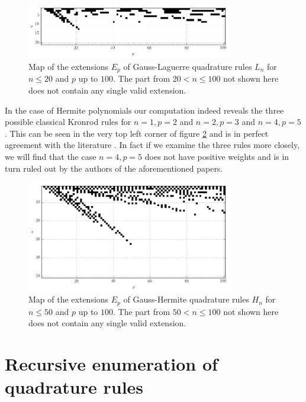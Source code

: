 \documentclass[a4paper,10pt]{article}
\begin{document}
\begin{figure}
  \centering
  \includegraphics[width=0.8\textwidth]{./img/map_lag_20_100.png}
  \caption{Map of the extensions $E_p$ of Gauss-Laguerre quadrature rules
           $L_n$ for $n \leq 20$ and $p$ up to $100$. The part from
           $20 < n \leq 100$ not shown here does not contain any single
           valid extension.}
  \label{fig:map_lag_20_100}
\end{figure}

In the case of Hermite polynomials our computation indeed reveals the three possible
classical Kronrod rules for $n=1, p=2$ and $n = 2, p = 3$ and $n = 4, p = 5$. This
can be seen in the very top left corner of figure \ref{fig:map_herm_50_100} and is
in perfect agreement with the literature \cite{monegato1976, kahaner-monegato, vladislav}.
In fact if we examine the three rules more closely, we will find that the case
$n = 4, p = 5$ does not have positive weights and is in turn ruled out by the
authors of the aforementioned papers.

\begin{figure}
  \centering
  \includegraphics[width=0.8\textwidth]{./img/map_herm_50_100.png}
  \caption{Map of the extensions $E_p$ of Gauss-Hermite quadrature rules
           $H_n$ for $n \leq 50$ and $p$ up to $100$. The part from
           $50 < n \leq 100$ not shown here does not contain any single
           valid extension.}
  \label{fig:map_herm_50_100}
\end{figure}


\section{Recursive enumeration of quadrature rules}
\end{document}
